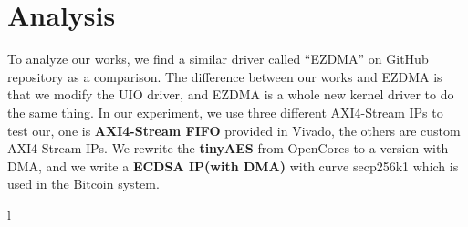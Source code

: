 
\chapter{Analysis}
\label{cha:Analysis}
To analyze our works, we find a similar driver called ``EZDMA''\cite{ezdma} on GitHub repository as a comparison. The difference between our works and EZDMA is that we modify the UIO driver, and EZDMA is a whole new kernel driver to do the same thing. In our experiment, we use three different AXI4-Stream IPs to test our, one is \textbf{AXI4-Stream FIFO} provided in Vivado, the others are custom AXI4-Stream IPs. We rewrite the \textbf{tinyAES}\cite{tinyaes} from OpenCores\cite{opencores} to a version with DMA, and we write a \textbf{ECDSA IP(with DMA)} with curve secp256k1 which is used in the Bitcoin system. 




l



